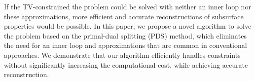 If the TV-constrained the problem could be solved with neither an inner loop nor these approximations, more efficient and accurate reconstructions of subsurface properties would be possible.
In this paper, we propose a novel algorithm to solve the problem based on the primal-dual splitting (PDS) method, which eliminates the need for an inner loop and approximations that are common in conventional approaches.
We demonstrate that our algorithm efficiently handles constraints without significantly increasing the computational cost, while achieving accurate reconstruction.






